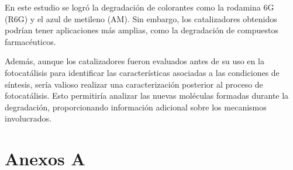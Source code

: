 \documentclass[12pt]{article}
\begin{document}
En este estudio se logró la degradación de colorantes como la rodamina 6G (R6G) y el azul de metileno (AM). Sin embargo, los catalizadores obtenidos podrían tener aplicaciones más amplias, como la degradación de compuestos farmacéuticos.\vspace{1em} %

Además, aunque los catalizadores fueron evaluados antes de su uso en la fotocatálisis para identificar las características asociadas a las condiciones de síntesis, sería valioso realizar una caracterización posterior al proceso de fotocatálisis. Esto permitiría analizar las nuevas moléculas formadas durante la degradación, proporcionando información adicional sobre los mecanismos involucrados.\vspace{1em} %



\newpage
 
 

\appendix  
\clearpage %
\addappheadtotoc 
\appendixpage 


\section{Anexos A}
\label{chap:anexo1}
\end{document}
